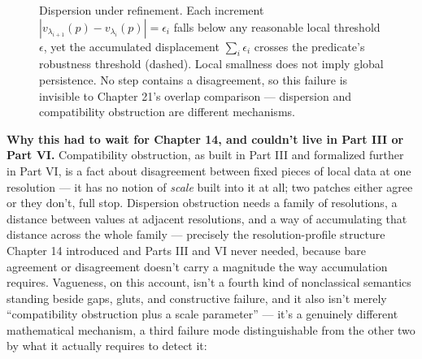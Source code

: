\begin{figure}[htbp]
\centering
{}
\caption{Dispersion under refinement. Each increment
$|v_{\lambda_{i+1}}(p) - v_{\lambda_i}(p)| = \epsilon_i$ falls below any
reasonable local threshold $\epsilon$, yet the accumulated displacement
$\sum_i \epsilon_i$ crosses the predicate's robustness threshold (dashed).
Local smallness does not imply global persistence. No step contains a
disagreement, so this failure is invisible to Chapter 21's overlap
comparison --- dispersion and compatibility obstruction are different
mechanisms.}
\label{fig:dispersion}
\end{figure}

\textbf{Why this had to wait for Chapter 14, and couldn't live in Part III or
Part VI.} Compatibility obstruction, as built in Part III and formalized
further in Part VI, is a fact about disagreement between fixed pieces of
local data at one resolution --- it has no notion of \emph{scale} built into it
at all; two patches either agree or they don't, full stop. Dispersion
obstruction needs a family of resolutions, a distance between values at
adjacent resolutions, and a way of accumulating that distance across the
whole family --- precisely the resolution-profile structure Chapter 14
introduced and Parts III and VI never needed, because bare agreement or
disagreement doesn't carry a magnitude the way accumulation requires.
Vagueness, on this account, isn't a fourth kind of nonclassical semantics
standing beside gaps, gluts, and constructive failure, and it also isn't
merely ``compatibility obstruction plus a scale parameter'' --- it's a
genuinely different mathematical mechanism, a third failure mode
distinguishable from the other two by what it actually requires to
detect it:

